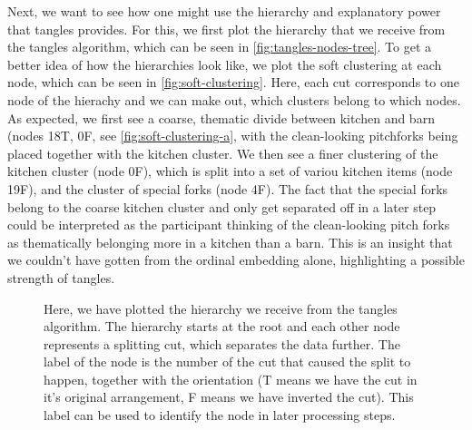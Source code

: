 Next, we want to see how one might use the hierarchy and explanatory power that tangles provides. For this, we first plot the hierarchy that we receive from the tangles
algorithm, which can be seen in \autoref{fig:tangles-nodes-tree}. To get a better idea of how the hierarchies look like, we plot the soft clustering at each node, which
can be seen in \autoref{fig:soft-clustering}. Here, each cut corresponds to one node of the hierachy and we can make out, which
clusters belong to which nodes. As expected, we first see a coarse, thematic divide between kitchen and barn (nodes 18T, 0F, see \autoref{fig:soft-clustering-a}, with 
the clean-looking pitchforks being placed together with the kitchen cluster. 
We then see a finer clustering of the kitchen cluster (node 0F), which is split into a set of variou kitchen items (node 19F), and the cluster of special forks (node 4F). 
The fact that the special forks belong to the coarse kitchen cluster and only get separated off in a later step could be interpreted as the participant thinking of the 
clean-looking pitch forks as thematically belonging more in a kitchen than a barn. This is an insight that we couldn't have gotten from the ordinal embedding alone,
highlighting a possible strength of tangles.


\onecolumn
\begin{figure}[ht]
    \centering
    \resizebox{0.6\textwidth}{!}{}
    \caption{
        Here, we have plotted the hierarchy we receive from the tangles algorithm. The hierarchy starts at the root and each other node represents a splitting cut, which
        separates the data further.  The label of the node is the number of the cut that caused the split to happen, together with the orientation (T means we have the cut in
        it's original arrangement, F means we have inverted the cut). This label can be used to identify the node in later processing steps.
    }
    \label{fig:tangles-nodes-tree}
\end{figure}


